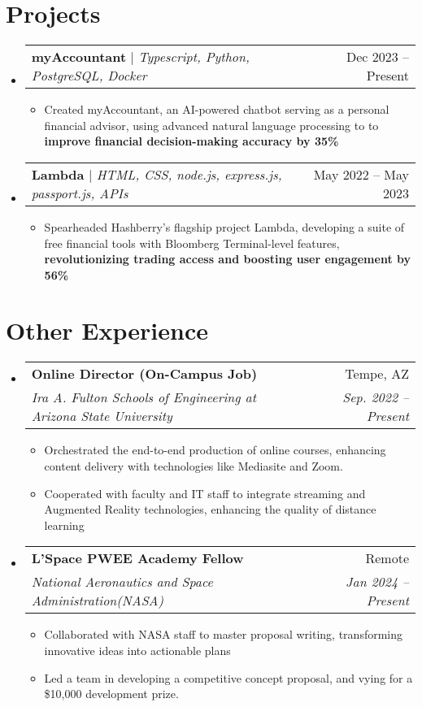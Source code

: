 \documentclass[letterpaper,11pt]{article}
\makeatletter
\newcommand{\resumeItem}[1]{
  \item\small{
    {#1 \vspace{-2pt}}
  }
}
\newcommand{\resumeSubheading}[4]{
  \vspace{-2pt}\item
    \begin{tabular*}{0.97\textwidth}[t]{l@{\extracolsep{\fill}}r}
      \textbf{#1} & #2 \\
      \textit{\small#3} & \textit{\small #4} \\
    \end{tabular*}\vspace{-7pt}
}
\newcommand{\resumeProjectHeading}[2]{
    \item
    \begin{tabular*}{0.97\textwidth}{l@{\extracolsep{\fill}}r}
      \small#1 & #2 \\
    \end{tabular*}\vspace{-7pt}
}
\newcommand{\resumeSubHeadingListStart}{\begin{itemize}[leftmargin=0.15in, label={}]}
\newcommand{\resumeSubHeadingListEnd}{\end{itemize}}
\newcommand{\resumeItemListStart}{\begin{itemize}}
\newcommand{\resumeItemListEnd}{\end{itemize}\vspace{-5pt}}
\makeatother
\begin{document}
\section{Projects}
    \resumeSubHeadingListStart
      \resumeProjectHeading
          {\textbf{myAccountant} $|$ \emph{Typescript,  Python, PostgreSQL, Docker}}{Dec 2023 -- Present}
          \resumeItemListStart
          \resumeItem{Created myAccountant, an AI-powered chatbot serving as a personal financial advisor, using advanced natural language processing to to \textbf{improve financial decision-making accuracy by 35\%}}
\resumeItemListEnd
          \resumeProjectHeading
          {\textbf{Lambda} $|$ \emph{HTML, CSS, node.js, express.js, passport.js, APIs}}{May 2022 -- May 2023}
          \resumeItemListStart
            \resumeItem{Spearheaded Hashberry's flagship project Lambda, developing a suite of free financial tools with Bloomberg Terminal-level features, \textbf{revolutionizing trading access and boosting user engagement by 56\%}}
            
            
          \resumeItemListEnd

          

          

          
      
    \resumeSubHeadingListEnd

\section{Other Experience}
  \resumeSubHeadingListStart
    \resumeSubheading
      {Online Director (On-Campus Job)}{Tempe, AZ}
      {Ira A. Fulton Schools of Engineering at Arizona State University}{Sep. 2022 -- Present}
      \resumeItemListStart
        \resumeItem{Orchestrated the end-to-end production of online courses,  enhancing content delivery with technologies like Mediasite and Zoom.}
        \resumeItem{Cooperated with faculty and IT staff to integrate streaming and Augmented Reality technologies, enhancing the quality of distance learning}
        
      \resumeItemListEnd

      \resumeSubheading
      {L'Space PWEE Academy Fellow}{Remote}
      {National Aeronautics and Space Administration(NASA)}{Jan 2024 -- Present}
      \resumeItemListStart
        \resumeItem{Collaborated with NASA staff to master proposal writing, transforming innovative ideas into actionable plans}
        \resumeItem{Led a team in developing a competitive concept proposal, and vying for a \$10,000 development prize.}
      \resumeItemListEnd


      
\resumeSubHeadingListEnd

%



\end{document}
